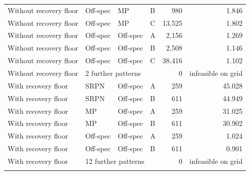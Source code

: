 \begin{table}[!htbp]
{\begin{tabular}{llllrr}
Without recovery floor & Off-spec & MP & B & 980 & 1.846\\
Without recovery floor & Off-spec & MP & C & 13,525 & 1.802\\
Without recovery floor & Off-spec & Off-spec & A & 2,156 & 1.269\\
Without recovery floor & Off-spec & Off-spec & B & 2,508 & 1.146\\
Without recovery floor & Off-spec & Off-spec & C & 38,416 & 1.102\\
Without recovery floor & \multicolumn{3}{l}{2 further patterns} & 0 & infeasible on grid\\\addlinespace[2pt]
With recovery floor & SRPN & Off-spec & A & 259 & 45.028\\
With recovery floor & SRPN & Off-spec & B & 611 & 44.949\\
With recovery floor & MP & Off-spec & A & 259 & 31.025\\
With recovery floor & MP & Off-spec & B & 611 & 30.902\\
With recovery floor & Off-spec & Off-spec & A & 259 & 1.024\\
With recovery floor & Off-spec & Off-spec & B & 611 & 0.901\\
With recovery floor & \multicolumn{3}{l}{12 further patterns} & 0 & infeasible on grid\\\addlinespace[2pt]
\bottomrule\end{tabular}}
\end{table}